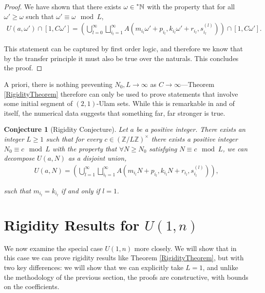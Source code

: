 \documentclass{amsart}
\newcommand{\NN}{\mathbb{N}}
\newcommand{\ZZ}{\mathbb{Z}}
\newcommand{\HN}{\prescript{*}{}{\NN}}
\theoremstyle{theorem}
\newtheorem{conjecture}{Conjecture}[section]
\theoremstyle{definition}
\begin{document}
\begin{proof}
We have shown that there exists $\omega \in \HN$ with the property that for all $\omega' \geq \omega$ such that $\omega' \equiv \omega \mod L$,
	\begin{align*}
	U(a,\omega') \cap [1,C\omega'] = \left(\bigcup_{l = 0}^\infty\bigsqcup_{i_l = 1}^\infty A\left(m_{i_l}\omega' + p_{i_l}, k_{i_l}\omega' + r_{i_l},s^{(l)}_{i_l}\right)\right) \cap [1,C\omega'].
	\end{align*}
		
\noindent This statement can be captured by first order logic, and therefore we know that by the transfer principle it must also be true over the naturals. This concludes the proof.
\end{proof}

A priori, there is nothing preventing $N_0, L \rightarrow \infty$ as $C \rightarrow \infty$---Theorem \ref{RigidityTheorem} therefore can only be used to prove statements that involve some initial segment of $(2,1)$-Ulam sets. While this is remarkable in and of itself, the numerical data suggests that something far, far stronger is true.

\begin{conjecture}[Rigidity Conjecture]\label{Rigidity Conjecture}
Let $a$ be a positive integer. There exists an integer $L \geq 1$ such that for every $c \in \left(\ZZ/L\ZZ\right)^\times$ there exists a positive integer $N_0 \equiv c \mod L$ with the property that $\forall N \geq N_0$ satisfying $N \equiv c \mod L$, we can decompose $U(a,N)$ as a disjoint union,
	\begin{align*}
	U(a,N) = \left(\bigcup_{l = 1}^\infty\bigsqcup_{i_l = 1}^\infty A\left(m_{i_l}N + p_{i_l}, k_{i_l}N + r_{i_l},s^{(l)}_{i_l}\right)\right),
	\end{align*}
			
\noindent such that $m_{i_l} = k_{i_l}$ if and only if $l = 1$.
\end{conjecture}
    
\section{Rigidity Results for $U(1,n)$}\label{Special Rigidity Section}
We now examine the special case $U(1,n)$ more closely. We will show that in this case we can prove rigidity results like Theorem \ref{RigidityTheorem}, but with two key differences: we will show that we can explicitly take $L = 1$, and unlike the methodology of the previous section, the proofs are constructive, with bounds on the coefficients.
\end{document}
